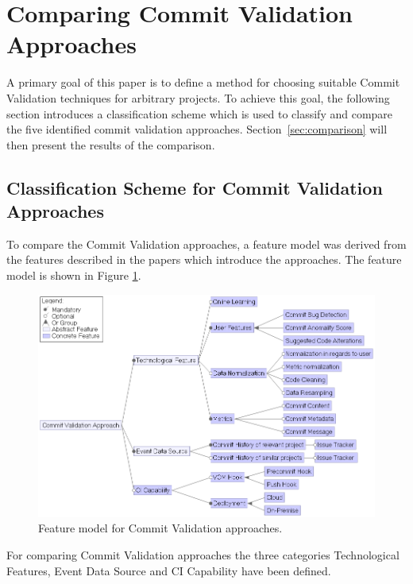 \section{Comparing Commit Validation Approaches}
\label{sec:comparingapproaches}


A primary goal of this paper is to define a method for choosing suitable Commit Validation techniques for arbitrary projects. To achieve this goal, the following section introduces a classification scheme which is used to classify and compare the five identified commit validation approaches. Section~\ref{sec:comparison} will then present the results of the comparison.

\subsection{Classification Scheme for Commit Validation Approaches}
\label{sec:scheme}

To compare the Commit Validation approaches, a feature model was derived from the features described in the papers which introduce the approaches. The feature model is shown in Figure \ref{fig:featuremodel}.

\begin{figure}[t]
	\centering
	\includegraphics[width=15cm]{images/featuremodel}
	\caption{Feature model for Commit Validation approaches.}
	\label{fig:featuremodel}
\end{figure}

For comparing Commit Validation approaches the three categories Technological Features, Event Data Source and CI Capability have been defined.

